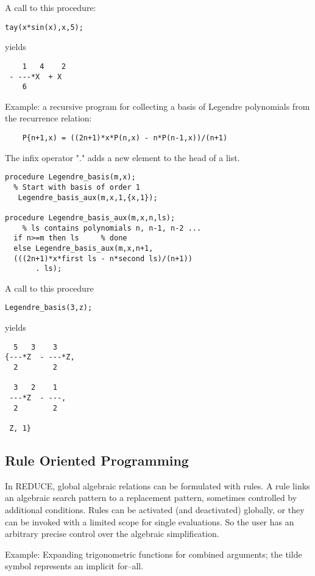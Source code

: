A call to this procedure:
\begin{verbatim}
tay(x*sin(x),x,5);
\end{verbatim}
yields
\begin{verbatim}
    1   4    2
 - ---*X  + X
    6
\end{verbatim}

Example: a recursive program for collecting a basis of Legendre
polynomials from the recurrence relation:

\begin{verbatim}
    P{n+1,x) = ((2n+1)*x*P(n,x) - n*P(n-1,x))/(n+1)
\end{verbatim}


The infix operator "." adds a new element to the head of a list.

\begin{verbatim}
procedure Legendre_basis(m,x);
  % Start with basis of order 1
   Legendre_basis_aux(m,x,1,{x,1});

procedure Legendre_basis_aux(m,x,n,ls);
    % ls contains polynomials n, n-1, n-2 ...
  if n>=m then ls     % done
  else Legendre_basis_aux(m,x,n+1,
  (((2n+1)*x*first ls - n*second ls)/(n+1))
       . ls);
\end{verbatim}

A call to this procedure
\begin{verbatim}
Legendre_basis(3,z);
\end{verbatim}
yields
\begin{verbatim}
  5   3    3
{---*Z  - ---*Z,
  2        2

  3   2    1
 ---*Z  - ---,
  2        2

 Z, 1}
\end{verbatim}

\subsection{Rule Oriented Programming}

In {\small REDUCE}, global algebraic relations can be formulated with
rules.  A rule links an algebraic search pattern to a replacement pattern,
sometimes controlled by additional conditions.  Rules can be activated
(and deactivated) globally, or they can be invoked with a limited scope
for single evaluations.  So the user has an arbitrary precise control over
the algebraic simplification.

Example:  Expanding trigonometric functions for combined arguments; the
tilde symbol represents an implicit for--all.


